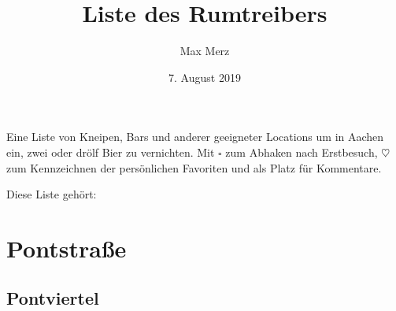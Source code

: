 \documentclass[8pt]{article}
\title{Liste des Rumtreibers}
\author{Max Merz}
\date{7. August 2019}
\begin{document}
\begin{titlepage}
	\centering
	{\strut\par}
	\vfill
	{\Large \makeatletter\@title\makeatother \par}
	\vspace{4em}
	{Eine Liste von  Kneipen, Bars und anderer geeigneter Locations um in Aachen ein, zwei oder drölf Bier zu vernichten.
	Mit $\square$ zum Abhaken nach Erstbesuch, $\heartsuit$ zum Kennzeichnen der persönlichen Favoriten und \underline{\hspace{3em}} als Platz für Kommentare.\par}
	\vfill
	\vfill
	{\footnotesize
		Diese Liste gehört: \underline{\hspace{20em}}
	\par}
\end{titlepage}

\newpage

\section{Pontstraße}
\label{sec:pontstrasse}

\begin{locations}
\end{locations}

\begin{locations}
\end{locations}

\begin{locations}
\end{locations}

\subsection{Pontviertel}
\label{sub:pontviertel}

\begin{locations}
\end{locations}
\end{document}
